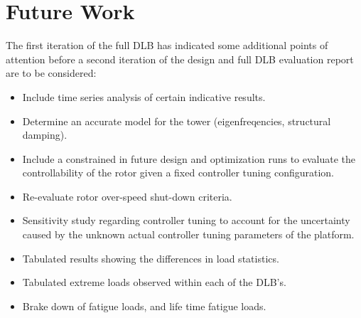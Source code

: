 \section{Future Work}
\label{sec:dlb:Future Work}

The first iteration of the full DLB has indicated some additional points of attention before a second iteration of the design and full DLB evaluation report are to be considered:

\begin{itemize}
	\item Include time series analysis of certain indicative results.
	\item Determine an accurate model for the tower (eigenfreqencies, structural damping).
	\item Include a constrained in future design and optimization runs to evaluate the controllability of the rotor given a fixed controller tuning configuration.
	\item Re-evaluate rotor over-speed shut-down criteria.
	\item Sensitivity study regarding controller tuning to account for the uncertainty caused by the unknown actual controller tuning parameters of the platform.
	\item Tabulated results showing the differences in load statistics.
	\item Tabulated extreme loads observed within each of the DLB's.
	\item Brake down of fatigue loads, and life time fatigue loads.
\end{itemize}
